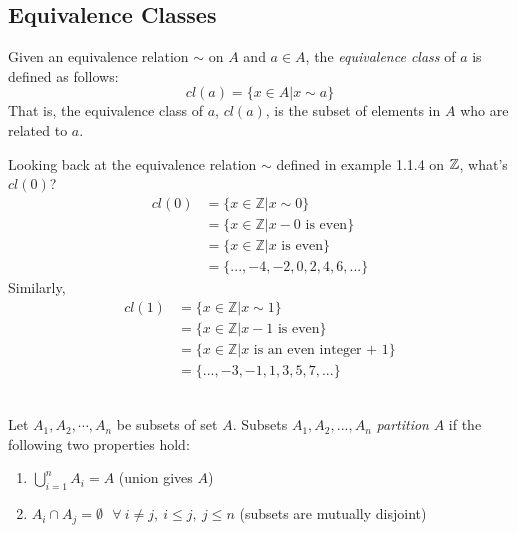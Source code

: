 \subsection{Equivalence Classes}
\begin{definition}
Given an equivalence relation $\sim$  on $A$ and $a\in A$, the \textit{equivalence class} of $a$ is
defined as follows:
\begin{equation}
    cl(a)=\{x\in A | x \sim a\} \nonumber
\end{equation}
That is, the equivalence class of $a$, $cl(a)$, is the subset of elements in $A$ who are related to
$a$.
\end{definition}


\noindent Looking back at the equivalence relation $\sim$ defined in example 1.1.4 on ${\mathbb{Z}}$, what's
$cl(0)$?\\
\begin{align}
    cl(0)&= \{x\in \mathbb{Z}| x\sim 0\} \nonumber\\
    &= \{x\in \mathbb{Z}| x-0 \text{ is even}\}\nonumber\\
    &= \{x\in \mathbb{Z}| x \text{ is even}\}\nonumber\\
    &= \{...,-4,-2,0,2,4,6, ...\}\nonumber
\end{align}
Similarly,
\begin{align}
    cl(1)&= \{x\in \mathbb{Z}| x\sim 1\} \nonumber\\
    &= \{x\in \mathbb{Z}| x-1 \text{ is even}\}\nonumber\\
    &= \{x\in \mathbb{Z}| x \text{ is an even integer + 1}\}\nonumber\\
    &= \{...,-3,-1,1,3,5,7, ...\}\nonumber
\end{align} \\
\newpage
\begin{definition}[Partition]
Let $A_1, A_2, \cdots , A_n$ be subsets of set $A$. Subsets $A_1, A_2, ..., A_n$ \textit{partition}
$A$ if the following two properties hold:
\begin{enumerate}[label=(\roman*)]
    \item $\bigcup_{i=1}^n A_i=A$ \hfill (union gives $A$)
    \item $A_i\cap A_j = \emptyset \ \ \ \forall\  i\neq j, \ i\leq j, \ j\leq n$ \hfill (subsets
    are mutually disjoint)
\end{enumerate}
\end{definition}

